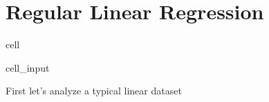 \documentclass[letterpaper,10pt,english]{jupyterBook}
\begin{document}
\section{Regular Linear Regression}
\label{\detokenize{lessons/LogLogRegression:regular-linear-regression}}
\begin{sphinxuseclass}{cell}\begin{sphinxVerbatimInput}

\begin{sphinxuseclass}{cell_input}
\begin{sphinxVerbatim}[commandchars=\\\{\}]
   
   
\end{sphinxVerbatim}

\end{sphinxuseclass}\end{sphinxVerbatimInput}

\end{sphinxuseclass}
\sphinxAtStartPar
First let’s analyze a typical linear dataset
\end{document}
